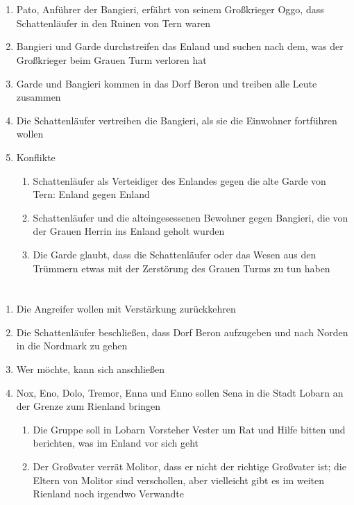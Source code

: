 \documentclass[12pt,a4paper,onecolumn,oneside,ngerman]{book}
\newcommand{\Tern}{Tern}
\newcommand{\Beron}{Beron}
\newcommand{\Molitor}{Molitor}
\newcommand{\Sena}{Sena}
\newcommand{\Bangiri}{Bangieri}
\newcommand{\Pato}{Pato}
\newcommand{\Oggo}{Oggo}
\newcommand{\Enland}{Enland}
\newcommand{\Schattenlaufer}{Schattenläufer}
\newcommand{\Eno}{Eno}
\newcommand{\Dolo}{Dolo}
\newcommand{\Nox}{Nox}
\newcommand{\Enna}{Enna}
\newcommand{\Enno}{Enno}
\newcommand{\Tremor}{Tremor}
\newcommand{\Lobarn}{Lobarn}
\newcommand{\Vester}{Vester}
\newcommand{\Nordmark}{Nordmark}
\newcommand{\Rhinland}{Rienland}
\begin{document}
\chapter[{\Pato}{s} Rache]{}
\begin{enumerate}
  \item {\Pato}, Anführer der {\Bangiri}, erfährt von seinem Großkrieger {\Oggo}, dass {\Schattenlaufer} in den Ruinen von {\Tern} waren
  \item {\Bangiri} und Garde durchstreifen das {\Enland} und suchen nach dem, was der Großkrieger beim Grauen Turm verloren hat
  \item Garde und {\Bangiri} kommen in das Dorf {\Beron} und treiben alle Leute zusammen
  \item Die {\Schattenlaufer} vertreiben die {\Bangiri}, als sie die Einwohner fortführen wollen
  \item Konflikte
  \begin{enumerate}
    \item {\Schattenlaufer} als Verteidiger des {\Enland}es gegen die alte Garde von Tern: {\Enland} gegen {\Enland} 
    \item {\Schattenlaufer} und die alteingesessenen Bewohner gegen {\Bangiri}, die von der Grauen Herrin ins {\Enland} geholt wurden
    \item Die Garde glaubt, dass die {\Schattenlaufer} oder das Wesen aus den Trümmern etwas mit der Zerstörung des Grauen Turms zu tun haben
  \end{enumerate}
\end{enumerate}

\chapter[Der Aufbruch]{}
\begin{enumerate}
  \item Die Angreifer wollen mit Verstärkung zurückkehren
  \item Die {\Schattenlaufer} beschließen, dass Dorf {\Beron} aufzugeben und nach Norden in die {\Nordmark} zu gehen
  \item Wer möchte, kann sich anschließen
  \item {\Nox}, {\Eno}, {\Dolo}, {\Tremor}, {\Enna} und {\Enno} sollen {\Sena} in die Stadt {\Lobarn} an der Grenze zum {\Rhinland} bringen
  \begin{enumerate}
    \item Die Gruppe soll in {\Lobarn} Vorsteher {\Vester} um Rat und Hilfe bitten und berichten, was im {\Enland} vor sich geht
    \item Der Großvater verrät {\Molitor}, dass er nicht der richtige Großvater ist; die Eltern von {\Molitor} sind verschollen, aber vielleicht gibt es im weiten {\Rhinland} noch irgendwo Verwandte
  \end{enumerate}
\end{enumerate}
\end{document}
